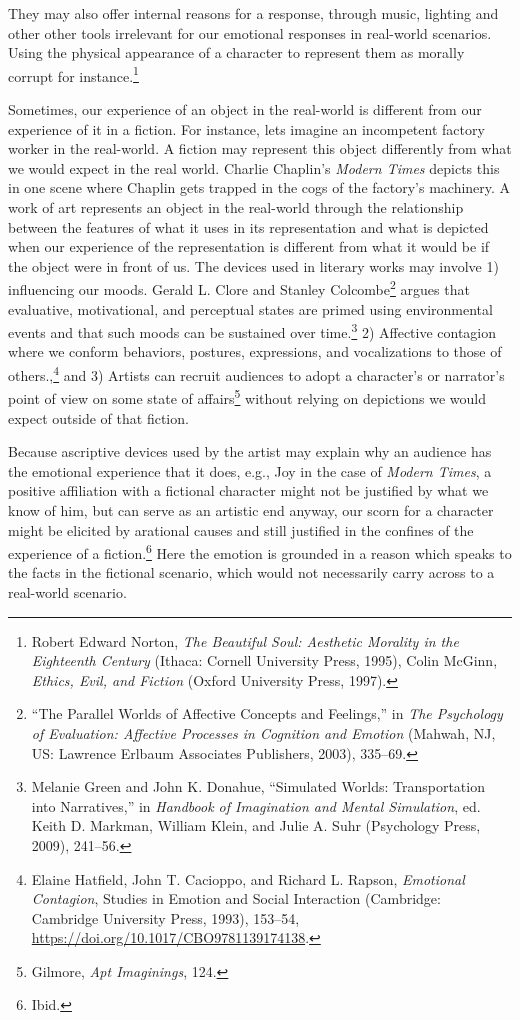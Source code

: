 \documentclass[phdthesis,12pt,final,a4paper]{wuthesis}
\theoremstyle{definition}
\theoremstyle{definition}
\theoremstyle{definition}
\theoremstyle{definition}
\theoremstyle{remark}
\begin{document}
They may also offer internal reasons for a response, through music, lighting and other other tools irrelevant for our emotional responses in real-world scenarios. Using the physical appearance of a character to represent them as morally corrupt for instance.\footnote{Robert Edward Norton, \emph{The Beautiful Soul: Aesthetic Morality in the Eighteenth Century} (Ithaca: Cornell University Press, 1995), Colin McGinn, \emph{Ethics, {Evil}, and {Fiction}} (Oxford University Press, 1997).}

Sometimes, our experience of an object in the real-world is different from our experience of it in a fiction. For instance, lets imagine an incompetent factory worker in the real-world. A fiction may represent this object differently from what we would expect in the real world. Charlie Chaplin's \emph{Modern Times} depicts this in one scene where Chaplin gets trapped in the cogs of the factory's machinery. A work of art represents an object in the real-world through the relationship between the features of what it uses in its representation and what is depicted when our experience of the representation is different from what it would be if the object were in front of us. The devices used in literary works may involve 1) influencing our moods. Gerald L. Clore and Stanley Colcombe\footnote{{``The Parallel Worlds of Affective Concepts and Feelings,''} in \emph{The Psychology of Evaluation: {Affective} Processes in Cognition and Emotion} (Mahwah, NJ, US: Lawrence Erlbaum Associates Publishers, 2003), 335--69.} argues that evaluative, motivational, and perceptual states are primed using environmental events and that such moods can be sustained over time.\footnote{Melanie Green and John K. Donahue, {``Simulated {Worlds}: {Transportation} into {Narratives},''} in \emph{Handbook of {Imagination} and {Mental Simulation}}, ed. Keith D. Markman, William Klein, and Julie A. Suhr (Psychology Press, 2009), 241--56.} 2) Affective contagion where we conform behaviors, postures, expressions, and vocalizations to those of others.,\footnote{Elaine Hatfield, John T. Cacioppo, and Richard L. Rapson, \emph{Emotional {Contagion}}, Studies in {Emotion} and {Social Interaction} (Cambridge: Cambridge University Press, 1993), 153--54, \url{https://doi.org/10.1017/CBO9781139174138}.} and 3) Artists can recruit audiences to adopt a character's or narrator's point of view on some state of affairs\footnote{Gilmore, \emph{Apt {Imaginings}}, 124.} without relying on depictions we would expect outside of that fiction.

Because ascriptive devices used by the artist may explain why an audience has the emotional experience that it does, e.g., Joy in the case of \emph{Modern Times}, a positive affiliation with a fictional character might not be justified by what we know of him, but can serve as an artistic end anyway, our scorn for a character might be elicited by arational causes and still justified in the confines of the experience of a fiction.\footnote{Ibid.} Here the emotion is grounded in a reason which speaks to the facts in the fictional scenario, which would not necessarily carry across to a real-world scenario.
\end{document}

